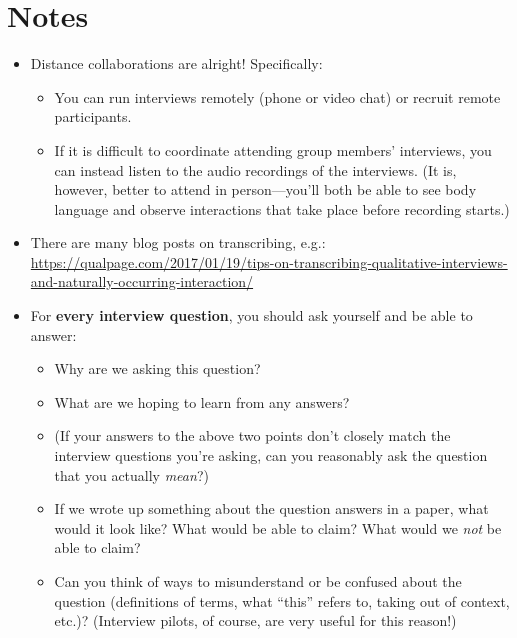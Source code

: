 \documentclass{article}
\begin{document}
\section*{Notes}
\begin{itemize}
    \item Distance collaborations are alright! Specifically:
    \begin{itemize}
        \item You can run interviews remotely (phone or video chat) or recruit remote participants.
        \item If it is difficult to coordinate attending group members' interviews, you can instead listen to the audio recordings of the interviews. (It is, however, better to attend in person---you'll both be able to see body language and observe interactions that take place before recording starts.)
    \end{itemize}
    \item There are many blog posts on transcribing, e.g.: \href{https://qualpage.com/2017/01/19/tips-on-transcribing-qualitative-interviews-and-naturally-occurring-interaction/}{https://qualpage.com/2017/01/19/tips-on-transcribing-qualitative-interviews-and-naturally-occurring-interaction/}
    \item For \textbf{every interview question}, you should ask yourself and be able to answer:
    \begin{itemize}
        \item Why are we asking this question?
        \item What are we hoping to learn from any answers?
        \item (If your answers to the above two points don't closely match the interview questions you're asking, can you reasonably ask the question that you actually \textit{mean}?)
        \item If we wrote up something about the question answers in a paper, what would it look like? What would be able to claim? What would we \textit{not} be able to claim?
        \item Can you think of ways to misunderstand or be confused about the question (definitions of terms, what ``this'' refers to, taking out of context, etc.)? (Interview pilots, of course, are very useful for this reason!)
    \end{itemize}
    
\end{itemize}
\end{document}
